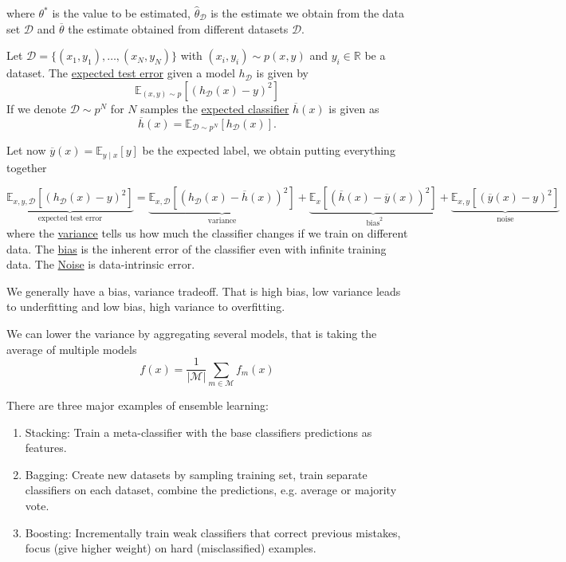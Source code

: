 \documentclass[12 pt]{article}        	%
\begin{document}
where $ \theta^* $ is the value to be estimated, $ \hat{ \theta }_{ \mathcal{ D } } $ is the estimate we obtain from the data set $ \mathcal{ D } $ and $ \overline{ \theta } $ the estimate obtained from different datasets $ \mathcal{ D } $.
\begin{defi}
    Let $ \mathcal{ D } = \{ ( x_1 , y_1 ) , \dotsc , ( x_N , y_N ) \} $ with $ ( x_i , y_i ) \sim p ( x , y ) $ and $ y_i \in \mathbb{ R } $ be a dataset.
    The \underline{expected test error} given a model $ h_{ \mathcal{ D } }$ is given by
    \[
        \mathbb{ E }_{ ( x , y ) \sim p } [ ( h_{ \mathcal{ D } } ( x ) - y )^2   ]
    \]
    If we denote $ \mathcal{ D } \sim p^N $ for $ N $ samples the \underline{expected classifier} $ \overline{h} ( x ) $ is given as 
    \[
        \overline{ h } ( x ) = \mathbb{ E }_{ \mathcal{ D } \sim p^N } [ h_{ \mathcal{ D } } ( x ) ].
    \]
\end{defi}

Let now $ \overline{ y } ( x ) = \mathbb{ E }_{ y \mid x } [ y ] $ be the expected label, we obtain putting everything together

\[
    \underbrace{ \mathbb{ E }_{ x , y , \mathcal{ D } } [ ( h_{ \mathcal{ D } } ( x ) - y )^2 ] }_{ \text{ expected test error } } 
    =
    \underbrace{ \mathbb{ E }_{ x , \mathcal{ D } } [ ( h_{ \mathcal{ D } } ( x ) - \overline{ h } ( x ) )^2 ] }_{ \text{ variance } } 
    + 
    \underbrace{ \mathbb{ E }_{ x } [ ( \overline{ h } ( x ) - \overline{ y } ( x )  )^2 ] }_{ \text{ bias}^2 } 
    +
    \underbrace{ \mathbb{ E }_{ x , y } [ ( \overline{ y } ( x ) - y )^2 ] }_{ \text{ noise } } 
\]
where the \underline{variance} tells us how much the classifier changes if we train on different data.
The \underline{bias} is the inherent error of the classifier even with infinite training data.
The \underline{Noise} is data-intrinsic error.

\begin{rmk} 
    We generally have a bias, variance tradeoff.
    That is high bias, low variance leads to underfitting and low bias, high variance 
    to overfitting.
\end{rmk}

We can lower the variance by aggregating several models, that is taking the average of multiple models
\[
    f ( x ) = \frac{ 1 }{ \lvert \mathcal{ M } \rvert } \sum_{ m \in \mathcal{ M } } f_m ( x ) 
\]

There are three major examples of ensemble learning:
\begin{enumerate}
    \item 
    Stacking: 
    Train a meta-classifier with the base classifiers predictions as features.

    \item 
    Bagging: 
    Create new datasets by sampling training set, train separate classifiers on each dataset, combine the predictions, e.g. average or majority vote.

    \item 
    Boosting:
    Incrementally train weak classifiers that correct previous mistakes, focus (give higher weight) on hard (misclassified) examples.
\end{enumerate}
\end{document}
